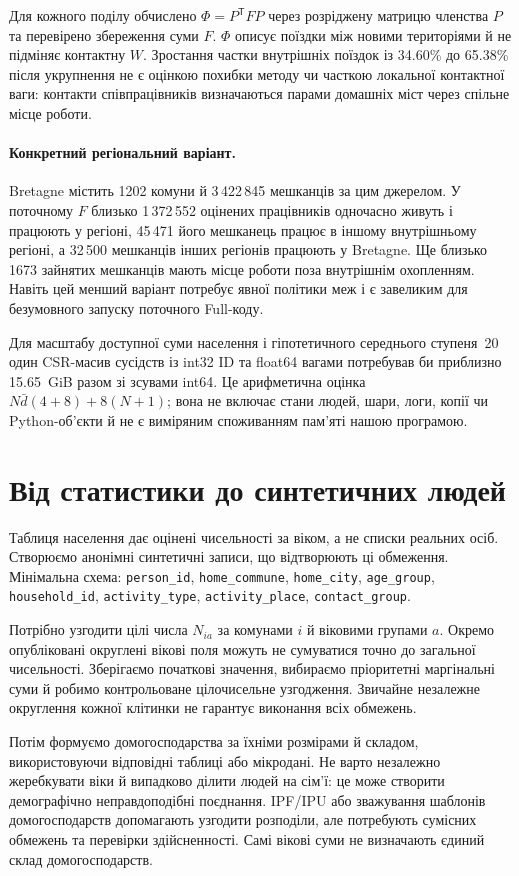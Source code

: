 \documentclass[11pt,a4paper]{article}
\begin{document}
Для кожного поділу обчислено $\Phi=P^\mathsf{T}FP$ через розріджену матрицю членства $P$ та перевірено збереження суми $F$. $\Phi$ описує поїздки між новими територіями й не підміняє контактну $W$. Зростання частки внутрішніх поїздок із 34.60\% до 65.38\% після укрупнення не є оцінкою похибки методу чи часткою локальної контактної ваги: контакти співпрацівників визначаються парами домашніх міст через спільне місце роботи.

\paragraph{Конкретний регіональний варіант.} Bretagne містить 1202 комуни й 3\,422\,845 мешканців за цим джерелом. У поточному $F$ близько 1\,372\,552 оцінених працівників одночасно живуть і працюють у регіоні, 45\,471 його мешканець працює в іншому внутрішньому регіоні, а 32\,500 мешканців інших регіонів працюють у Bretagne. Ще близько 1673 зайнятих мешканців мають місце роботи поза внутрішнім охопленням. Навіть цей менший варіант потребує явної політики меж і є завеликим для безумовного запуску поточного Full-коду.

Для масштабу доступної суми населення і гіпотетичного середнього ступеня~20 один CSR-масив сусідств із int32 ID та float64 вагами потребував би приблизно 15.65~GiB разом зі зсувами int64. Це арифметична оцінка $N\bar d(4+8)+8(N+1)$; вона не включає стани людей, шари, логи, копії чи Python-об'єкти й не є виміряним споживанням пам'яті нашою програмою.

\section{Від статистики до синтетичних людей}
Таблиця населення дає оцінені чисельності за віком, а не списки реальних осіб. Створюємо анонімні синтетичні записи, що відтворюють ці обмеження. Мінімальна схема: \texttt{person\_id}, \texttt{home\_commune}, \texttt{home\_city}, \texttt{age\_group}, \texttt{household\_id}, \texttt{activity\_type}, \texttt{activity\_place}, \texttt{contact\_group}.

Потрібно узгодити цілі числа $N_{ia}$ за комунами $i$ й віковими групами $a$. Окремо опубліковані округлені вікові поля можуть не сумуватися точно до загальної чисельності. Зберігаємо початкові значення, вибираємо пріоритетні маргінальні суми й робимо контрольоване цілочисельне узгодження. Звичайне незалежне округлення кожної клітинки не гарантує виконання всіх обмежень.

Потім формуємо домогосподарства за їхніми розмірами й складом, використовуючи відповідні таблиці або мікродані. Не варто незалежно жеребкувати віки й випадково ділити людей на сім'ї: це може створити демографічно неправдоподібні поєднання. IPF/IPU або зважування шаблонів домогосподарств допомагають узгодити розподіли, але потребують сумісних обмежень та перевірки здійсненності. Самі вікові суми не визначають єдиний склад домогосподарств.
\end{document}
